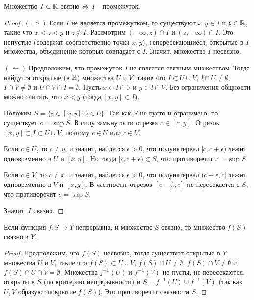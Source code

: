 \begin{theorem}
    \label{th_coher_spac}
    Множество $I \subset \mathbb{R}$ связно $\Leftrightarrow$ $I$ -- промежуток.
\end{theorem}

\begin{proof}
    $(\Rightarrow)$ Если $I$ не является промежутком, то существуют $x, y \in I$ и $z \in \mathbb{R}$, такие что $x < z < y$ и $z \not\in I$. Рассмотрим $(-\infty, z) \cap I$ и $(z, +\infty) \cap I$. Это непустые (содержат соответственно точки $x, y$), непересекающиеся, открытые в $I$ множества, объединение которых совпадает с $I$. Значит, множество $I$ несвязно.
    
    $(\Leftarrow)$ Предположим, что промежуток $I$ не является связным множеством. Тогда найдутся открытые (в $\mathbb{R}$) множества $U$ и $V$, такие что $I \subset U \cup V$, $I \cap U \neq \emptyset$, $I \cap V \neq \emptyset$ и $U \cap V \cap I = \emptyset$. Пусть $x \in I \cap U$ и $y \in I \cap V$. Без ограничения общности можно считать, что $x < y$ (тогда $[x,y] \subset I$).

    Положим $S = \{z \in [x, y]: z \in U\}$. Так как $S$ не пусто и ограничено, то существует $c = \sup S$. В силу замкнутости отрезка $c \in [x, y]$. Отрезок $[x, y] \subset I \subset U \cup V$, поэтому $c \in U$ или $c \in V$.

    Если $c \in U$, то $c \neq y$, и значит, найдется $\epsilon > 0$, что полуинтервал $[c, c+\epsilon)$ лежит одновременно в $U$ и $[x, y]$. Но тогда $[c, c + \epsilon) \subset S$, что противоречит $c = \sup S$.

    Если $c \in V$, то $c \neq x$, и значит, найдется $\epsilon > 0$, что полуинтервал $(c - \epsilon, c]$ лежит одновременно в $V$ и $[x, y]$. В частности, отрезок $[c - \frac{\epsilon}{2}, c]$ не пересекается с $S$, что противоречит $c = \sup S$.

    Значит, $I$ связно.
\end{proof}

\begin{theorem}
    \label{th_contin_coher}
    Если функция $f: S \to Y$ непрерывна, и множество $S$ связно, то множество $f(S)$ связно в $Y$.
\end{theorem}

\begin{proof}
    Предположим, что $f(S)$ несвязно, тогда существют открытые в $Y$ множества $U$ и $V$, такие что $f(S) \subset U \cup V$, $f(S) \cap U \neq \emptyset$, $f(S) \cap V \neq \emptyset$ и $f(S) \cap U \cap V = \emptyset$. Множества $f^{-1}(U)$ и $f^{-1}(V)$ не пусты, не пересекаются, открыты в $S$ (по критерию непрерывности) и $S = f^{-1}(U) \cup f^{-1}(V)$ (так как $U, V$ образуют покрытие $f(S)$). Это противоречит связности $S$.
\end{proof}

